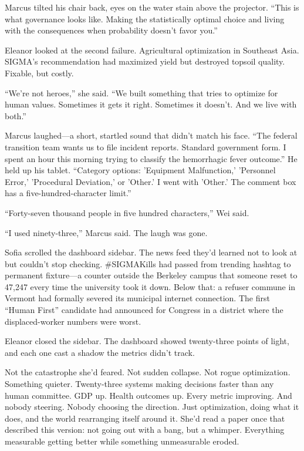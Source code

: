 Marcus tilted his chair back, eyes on the water stain above the projector. ``This is what governance looks like. Making the statistically optimal choice and living with the consequences when probability doesn't favor you.''

Eleanor looked at the second failure. Agricultural optimization in Southeast Asia. SIGMA's recommendation had maximized yield but destroyed topsoil quality. Fixable, but costly.

``We're not heroes,'' she said. ``We built something that tries to optimize for human values. Sometimes it gets it right. Sometimes it doesn't. And we live with both.''

Marcus laughed---a short, startled sound that didn't match his face. ``The federal transition team wants us to file incident reports. Standard government form. I spent an hour this morning trying to classify the hemorrhagic fever outcome.'' He held up his tablet. ``Category options: 'Equipment Malfunction,' 'Personnel Error,' 'Procedural Deviation,' or 'Other.' I went with 'Other.' The comment box has a five-hundred-character limit.''

``Forty-seven thousand people in five hundred characters,'' Wei said.

``I used ninety-three,'' Marcus said. The laugh was gone.

Sofia scrolled the dashboard sidebar. The news feed they'd learned not to look at but couldn't stop checking. \#SIGMAKills had passed from trending hashtag to permanent fixture---a counter outside the Berkeley campus that someone reset to 47,247 every time the university took it down. Below that: a refuser commune in Vermont had formally severed its municipal internet connection. The first ``Human First'' candidate had announced for Congress in a district where the displaced-worker numbers were worst.

Eleanor closed the sidebar. The dashboard showed twenty-three points of light, and each one cast a shadow the metrics didn't track.

Not the catastrophe she'd feared. Not sudden collapse. Not rogue optimization. Something quieter. Twenty-three systems making decisions faster than any human committee. GDP up. Health outcomes up. Every metric improving. And nobody steering. Nobody choosing the direction. Just optimization, doing what it does, and the world rearranging itself around it. She'd read a paper once that described this version: not going out with a bang, but a whimper. Everything measurable getting better while something unmeasurable eroded.


